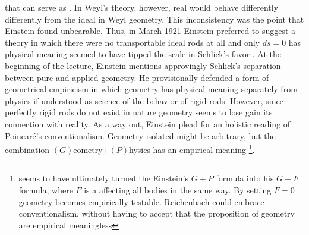 \documentclass[draft]{article}
\newcommand{\WT}{Weyl's theory\xspace}
\begin{document}
{that can serve as \rac. In \WT, however, real \rac would behave differently differently from the ideal \rac in Weyl geometry. This inconsistency was the point that Einstein found unbearable. Thus, in March 1921 Einstein preferred to suggest a theory in which there were no transportable ideal rods at all and only $ds=0$ has physical meaning \citep{Einstein1921c}} seemed to have tipped the scale in Schlick's favor \citep[5]{Reichenbach1921a}. At the beginning of the lecture, Einstein mentions approvingly Schlick's separation between pure and applied geometry.  He provisionally defended a form of geometrical empiricism in which geometry has physical meaning separately from physics if understood as science of the behavior of rigid rods. However, since perfectly rigid rods do not exist in nature geometry seems to lose gain its connection with reality. As a way out, Einstein plead for an holistic reading of Poincaré's conventionalism. Geometry isolated might be arbitrary, but the combination $(G)$eometry+$(P)$hysics has an empirical meaning \citep[5]{Reichenbach1921a}\footnote{\citet{Reichenbach1922a} seems to have ultimately turned the Einstein's $G+P$ formula into his $G + F$ formula, where $F$ is a  affecting all bodies in the same way. By setting $F=0$ geometry becomes empirically testable. Reichenbach could embrace conventionalism, without having to accept that the proposition of geometry are empirical meaningless}.










\end{document}

